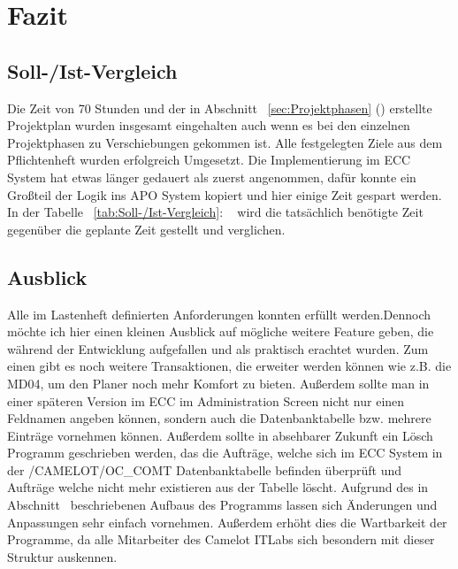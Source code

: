 \section{Fazit} 
\label{sec:Fazit}

\subsection{Soll-/Ist-Vergleich}
\label{sec:SollIstVergleich}

Die Zeit von 70 Stunden und der in Abschnitt ~\ref{sec:Projektphasen} () erstellte Projektplan wurden insgesamt eingehalten auch wenn es bei den einzelnen Projektphasen zu Verschiebungen gekommen ist. Alle festgelegten Ziele aus dem Pflichtenheft wurden erfolgreich Umgesetzt. Die Implementierung im \ac{ECC} System hat etwas länger gedauert als zuerst angenommen, dafür konnte ein Großteil der Logik ins \ac{APO} System kopiert und hier einige Zeit gespart werden. In der Tabelle ~\ref{tab:Soll-/Ist-Vergleich}: ~ wird die tatsächlich benötigte Zeit gegenüber die geplante Zeit gestellt und verglichen.

\subsection{Ausblick}
\label{sec:Ausblick}
Alle im Lastenheft definierten Anforderungen konnten erfüllt werden.Dennoch möchte ich hier einen kleinen Ausblick auf mögliche weitere Feature geben, die während der Entwicklung aufgefallen und als praktisch erachtet wurden. Zum einen gibt es noch weitere Transaktionen, die erweiter werden können wie z.B. die MD04, um den Planer noch mehr Komfort zu bieten. Außerdem sollte man in einer späteren Version im \ac{ECC} im Administration Screen nicht nur einen Feldnamen angeben können, sondern auch die Datenbanktabelle bzw. mehrere Einträge vornehmen können. Außerdem sollte in absehbarer Zukunft ein Lösch Programm geschrieben werden, das die Aufträge, welche sich im ECC System in der /CAMELOT/OC\_COMT Datenbanktabelle befinden überprüft und Aufträge welche nicht mehr existieren aus der Tabelle löscht. Aufgrund des in Abschnitt~ beschriebenen Aufbaus des Programms lassen sich Änderungen und Anpassungen sehr einfach vornehmen. Außerdem erhöht dies die Wartbarkeit der Programme, da alle Mitarbeiter des Camelot ITLabs sich besondern mit dieser Struktur auskennen. 
